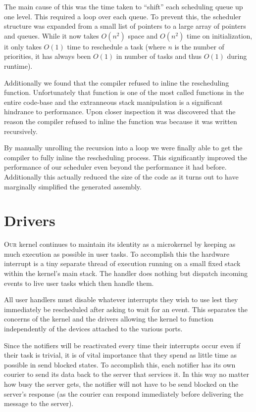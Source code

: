 \documentclass{article}
\begin{document}
The main cause of this was the time taken to ``shift'' each scheduling queue up
one level. This required a loop over each queue. To prevent this, the scheduler
structure was expanded from a small list of pointers to a large array of
pointers and queues. While it now takes $O(n^2)$ space and $O(n^2)$ time on
initialization, it only takes $O(1)$ time to reschedule a task (where $n$ is the
number of priorities, it has always been $O(1)$ in number of tasks and thus
$O(1)$ during runtime).

Additionally we found that the compiler refused to inline the rescheduling
function. Unfortunately that function is one of the most called functions in the
entire code-base and the extranneous stack manipulation is a significant
hindrance to performance. Upon closer inspection it was discovered that the
reason the compiler refused to inline the function was because it was written
recursively.

By manually unrolling the recursion into a loop we were finally able to get the
compiler to fully inline the rescheduling process. This significantly improved
the performance of our scheduler even beyond the performance it had before.
Additionally this actually reduced the size of the code as it turns out to have
marginally simplified the generated assembly.

\section*{Drivers}

\textsc{Our} kernel continues to maintain its identity as a microkernel by keeping as
much execution as possible in user tasks. To accomplish this the hardware
interrupt is a tiny separate thread of execution running on a small fixed stack
within the kernel's main stack. The handler does nothing but dispatch incoming
events to live user tasks which then handle them.

All user handlers must disable whatever interrupts they wish to use lest they
immediately be rescheduled after asking to wait for an event. This separates the
concerns of the kernel and the drivers allowing the kernel to function
independently of the devices attached to the various ports.

Since the notifiers will be reactivated every time their interrupts occur even if
their task is trivial, it is of vital importance that they spend as little time
as possible in send blocked states. To accomplish this, each notifier has its
own courier to send its data back to the server that services it. In this way no
matter how busy the server gets, the notifier will not have to be send blocked
on the server's response (as the courier can respond immediately before
delivering the message to the server).
\end{document}
